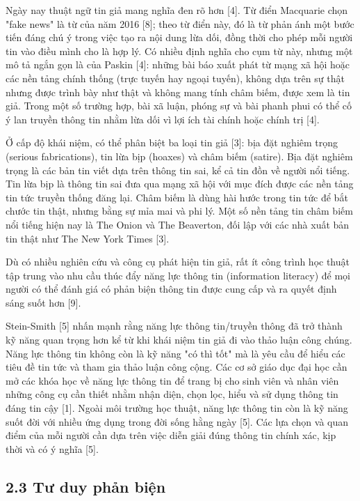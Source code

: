 Ngày nay thuật ngữ tin giả mang nghĩa đen rõ hơn {[}4{]}. Từ điển Macquarie chọn "fake news" là từ của năm 2016 {[}8{]}; theo từ điển này, đó là từ phản ánh một bước tiến đáng chú ý trong việc tạo ra nội dung lừa dối, đồng thời cho phép mỗi người tin vào điều mình cho là hợp lý. Có nhiều định nghĩa cho cụm từ này, nhưng một mô tả ngắn gọn là của Paskin {[}4{]}: những bài báo xuất phát từ mạng xã hội hoặc các nền tảng chính thống (trực tuyến hay ngoại tuyến), không dựa trên sự thật nhưng được trình bày như thật và không mang tính châm biếm, được xem là tin giả. Trong một số trường hợp, bài xã luận, phóng sự và bài phanh phui có thể cố ý lan truyền thông tin nhằm lừa dối vì lợi ích tài chính hoặc chính trị {[}4{]}.

Ở cấp độ khái niệm, có thể phân biệt ba loại tin giả {[}3{]}: bịa đặt nghiêm trọng (serious fabrications), tin lừa bịp (hoaxes) và châm biếm (satire). Bịa đặt nghiêm trọng là các bản tin viết dựa trên thông tin sai, kể cả tin đồn về người nổi tiếng. Tin lừa bịp là thông tin sai đưa qua mạng xã hội với mục đích được các nền tảng tin tức truyền thống đăng lại. Châm biếm là dùng hài hước trong tin tức để bắt chước tin thật, nhưng bằng sự mỉa mai và phi lý. Một số nền tảng tin châm biếm nổi tiếng hiện nay là The Onion và The Beaverton, đối lập với các nhà xuất bản tin thật như The New York Times {[}3{]}.

Dù có nhiều nghiên cứu và công cụ phát hiện tin giả, rất ít công trình học thuật tập trung vào nhu cầu thúc đẩy năng lực thông tin (information literacy) để mọi người có thể đánh giá có phản biện thông tin được cung cấp và ra quyết định sáng suốt hơn {[}9{]}.

Stein-Smith {[}5{]} nhấn mạnh rằng năng lực thông tin/truyền thông đã trở thành kỹ năng quan trọng hơn kể từ khi khái niệm tin giả đi vào thảo luận công chúng. Năng lực thông tin không còn là kỹ năng "có thì tốt" mà là yêu cầu để hiểu các tiêu đề tin tức và tham gia thảo luận công cộng. Các cơ sở giáo dục đại học cần mở các khóa học về năng lực thông tin để trang bị cho sinh viên và nhân viên những công cụ cần thiết nhằm nhận diện, chọn lọc, hiểu và sử dụng thông tin đáng tin cậy {[}1{]}. Ngoài môi trường học thuật, năng lực thông tin còn là kỹ năng suốt đời với nhiều ứng dụng trong đời sống hằng ngày {[}5{]}. Các lựa chọn và quan điểm của mỗi người cần dựa trên việc diễn giải đúng thông tin chính xác, kịp thời và có ý nghĩa {[}5{]}.

\subsection{2.3 Tư duy phản biện}

